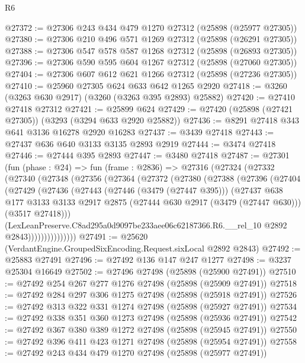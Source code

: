 \begin{lexlean}{R6}
\begin{coremodule}
@27372 := @27306 @243 @434 @479 @1270 @27312 (@25898 (@25977 @27305))
@27380 := @27306 @210 @496 @571 @1269 @27312 (@25898 (@26291 @27305))
@27388 := @27306 @547 @578 @587 @1268 @27312 (@25898 (@26893 @27305))
@27396 := @27306 @590 @595 @604 @1267 @27312 (@25898 (@27060 @27305))
@27404 := @27306 @607 @612 @621 @1266 @27312 (@25898 (@27236 @27305))
@27410 := @25960 @27305 @624 @633 @642 @1265 @2920
@27418 := @3260 (@3263 @630 @2917) (@3260 (@3263 @395 @2893) @25882)
@27420 := @27410 @27418 @27312
@27421 := @25899 @624
@27429 := @27420 (@25898 (@27421 @27305)) (@3293 (@3294 @633 @2920 @25882))
@27436 := @8291 @27418 @343 @641 @3136 @16278 @2920 @16283
@27437 := @3439 @27418
@27443 := @27437 @636 @640 @3133 @3135 @2893 @2919
@27444 := @3474 @27418
@27446 := @27444 @395 @2893
@27447 := @3480 @27418
@27487 := @27301
    (fun (phase : @24) =>
    fun (frame : @2836) =>
    @27316
      (@27324
        (@27332
          (@27340
            (@27348
              (@27356
                (@27364
                  (@27372
                    (@27380
                      (@27388
                        (@27396
                          (@27404
                            (@27429
                              (@27436
                                (@27443
                                  (@27446 (@3479 (@27447 @395)))
                                  (@27437
                                    @638
                                    @177
                                    @3133
                                    @3133
                                    @2917
                                    @2875
                                    (@27444 @630 @2917 (@3479 (@27447 @630)))
                                    (@3517 @27418)))
                                (LexLeanPreserve.C8ad295a0d9097be233aee06c62187366.R6.__rel_10
                                  @2892
                                  @2843)))))))))))))))
@27491 := @25620 (VerdantEngine.GroupedSixEncoding.Request.sixLocal @2892 @2843)
@27492 := @25883 @27491
@27496 := @27492 @136 @147 @247 @1277
@27498 := @3237 @25304 @16649
@27502 := @27496 @27498 (@25898 (@25900 @27491))
@27510 := @27492 @254 @267 @277 @1276 @27498 (@25898 (@25909 @27491))
@27518 := @27492 @284 @297 @306 @1275 @27498 (@25898 (@25918 @27491))
@27526 := @27492 @313 @322 @331 @1274 @27498 (@25898 (@25927 @27491))
@27534 := @27492 @338 @351 @360 @1273 @27498 (@25898 (@25936 @27491))
@27542 := @27492 @367 @380 @389 @1272 @27498 (@25898 (@25945 @27491))
@27550 := @27492 @396 @411 @423 @1271 @27498 (@25898 (@25954 @27491))
@27558 := @27492 @243 @434 @479 @1270 @27498 (@25898 (@25977 @27491))

\end{coremodule}
\end{lexlean}
